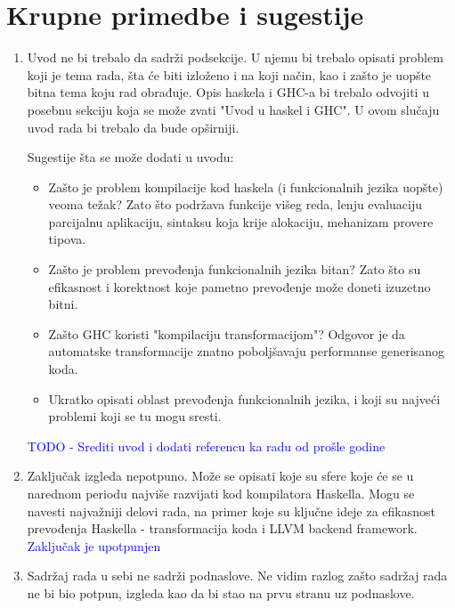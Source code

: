 \documentclass[a4paper]{report}
\newcommand{\odgovor}[1]{\textcolor{blue}{#1}}
\begin{document}
	\section{Krupne primedbe i sugestije}
	\begin{enumerate}  
		
		\item Uvod ne bi trebalo da sadrži podsekcije. U njemu bi trebalo opisati problem koji je tema rada, šta će biti izloženo i na koji način, kao i zašto je uopšte bitna tema koju rad obrađuje. Opis haskela i GHC-a bi trebalo odvojiti u posebnu sekciju koja se može zvati "Uvod u haskel i GHC". U ovom slučaju uvod rada bi trebalo da bude opširniji. 
		
		Sugestije šta se može dodati u uvodu:
		\begin{itemize}
			\item Zašto je problem kompilacije kod haskela (i funkcionalnih jezika uopšte) veoma težak? Zato što podržava funkcije višeg reda, lenju evaluaciju parcijalnu aplikaciju, sintaksu koja krije alokaciju, mehanizam provere tipova.
			
			\item Zašto je problem prevođenja funkcionalnih jezika bitan? Zato što su efikasnost i korektnost koje pametno prevođenje može doneti izuzetno bitni. 
			
			\item Zašto GHC koristi "kompilaciju transformacijom"? Odgovor je da automatske transformacije znatno poboljšavaju performanse generisanog koda.
			
			\item Ukratko opisati oblast prevođenja funkcionalnih jezika, i koji su najveći problemi koji se tu mogu sresti.
		\end{itemize}
		\odgovor{TODO - Srediti uvod i dodati referencu ka radu od prošle godine}
		
		
		\item Zaključak izgleda nepotpuno. Može se opisati koje su sfere koje će se u narednom periodu najviše razvijati kod kompilatora Haskella. Mogu se navesti najvažniji delovi rada, na primer koje su ključne ideje za efikasnost prevođenja Haskella - transformacija koda i LLVM backend framework.
		\odgovor{Zaključak je upotpunjen}
		
		
		\item Sadržaj rada u sebi ne sadrži podnaslove. Ne vidim razlog zašto sadržaj rada ne bi bio potpun, izgleda kao da bi stao na prvu stranu uz podnaslove.
		

\end{enumerate}
\end{document}

